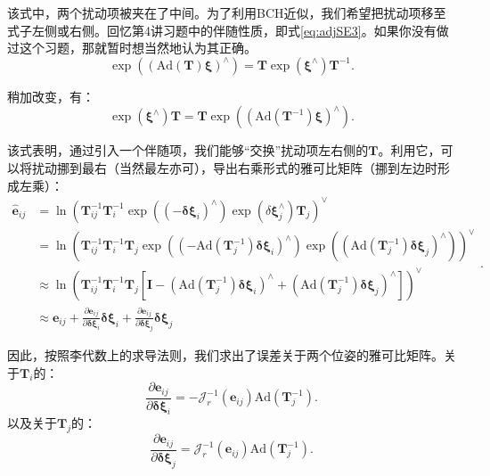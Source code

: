 该式中，两个扰动项被夹在了中间。为了利用BCH近似，我们希望把扰动项移至式子左侧或右侧。回忆第4讲习题中的伴随性质，即式\eqref{eq:adjSE3}。如果你没有做过这个习题，那就暂时想当然地认为其正确。
\begin{equation}
\exp \left( \left( \mathrm{Ad}(\bm{T}) \bm{\xi} \right) ^\wedge \right) = \bm{T} \exp(\bm{\xi}^\wedge)\bm{T}^{-1}.
\end{equation}

稍加改变，有：
\begin{equation}
\exp(\bm{\xi}^\wedge)\bm{T} = \bm{T} \exp \left( \left( \mathrm{Ad}(\bm{T}^{-1}) \bm{\xi} \right) ^\wedge \right) .
\end{equation}

该式表明，通过引入一个伴随项，我们能够“交换”扰动项左右侧的$\bm{T}$。利用它，可以将扰动挪到最右（当然最左亦可），导出右乘形式的雅可比矩阵（挪到左边时形成左乘）：
\clearpage
\begin{equation}
\begin{aligned}
\hat{ \bm{e}}_{ij} &= \ln \left( \bm{T}_{ij}^{-1}  \bm{T}_i^{-1} \exp((-\bm{\delta \xi}_i)^\wedge) \exp(\delta \bm{\xi}_j^\wedge) \bm{T}_j  \right)^\vee\\
&= \ln \left( \bm{T}_{ij}^{-1} \bm{T}_i^{-1} \bm{T}_j \exp \left( \left(- \mathrm{Ad}(\bm{T}_j^{-1}) \bm{\delta \xi}_i \right)^\wedge \right) \exp \left( \left( \mathrm{Ad}(\bm{T}_j^{-1})  \bm{\delta\xi}_j\right)^\wedge \right) \right)^\vee \\ 
&\approx \ln \left( \bm{T}_{ij}^{-1} \bm{T}_i^{-1} \bm{T}_j \left[ \bm{I} - (\mathrm{Ad}(\bm{T}_j^{-1}) \bm{\delta \xi}_i)^\wedge + (\mathrm{Ad}(\bm{T}_j^{-1})  \bm{\delta \xi}_j)^{\wedge} \right] \right)^\vee \\
& \approx \bm{e}_{ij} + \frac{\partial \bm{e}_{ij}}{\partial \bm{\delta \xi}_i} \bm{\delta \xi}_i + \frac{\partial \bm{e}_{ij}}{\partial \bm{\delta \xi}_j} \bm{\delta \xi}_j
\end{aligned}.
\end{equation}

因此，按照李代数上的求导法则，我们求出了误差关于两个位姿的雅可比矩阵。关于$\bm{T}_i$的：
\begin{equation}
\frac{\partial \bm{e}_{ij}}{\partial \bm{\delta \xi}_i} = - \bm{\mathcal{J}}_r^{-1}(\bm{e}_{ij}) \mathrm{Ad}(\bm{T}_j^{-1}).
\end{equation}
以及关于$\bm{T}_j$的：
\begin{equation}
\frac{\partial \bm{e}_{ij}}{\partial \bm{\delta \xi}_j} = \bm{\mathcal{J}}_r^{-1}(\bm{e}_{ij}) \mathrm{Ad}(\bm{T}_j^{-1}).
\end{equation}

